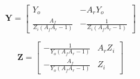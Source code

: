 \documentclass[a4paper, 12pt]{article}
\newcommand{\mat}[1]{\mathbf{#1}}
\begin{document}
\begin{equation}
\mat{Y} = \left[\begin{matrix}Y_{o} & - A_{r} Y_{o}\\\frac{A_{f}}{Z_{i} \left(A_{f} A_{r} - 1\right)} & - \frac{1}{Z_{i} \left(A_{f} A_{r} - 1\right)}\end{matrix}\right]
\end{equation}

\begin{equation}
\mat{Z} = \left[\begin{matrix}- \frac{1}{Y_{o} \left(A_{f} A_{r} - 1\right)} & A_{r} Z_{i}\\- \frac{A_{f}}{Y_{o} \left(A_{f} A_{r} - 1\right)} & Z_{i}\end{matrix}\right]
\end{equation}
\end{document}
